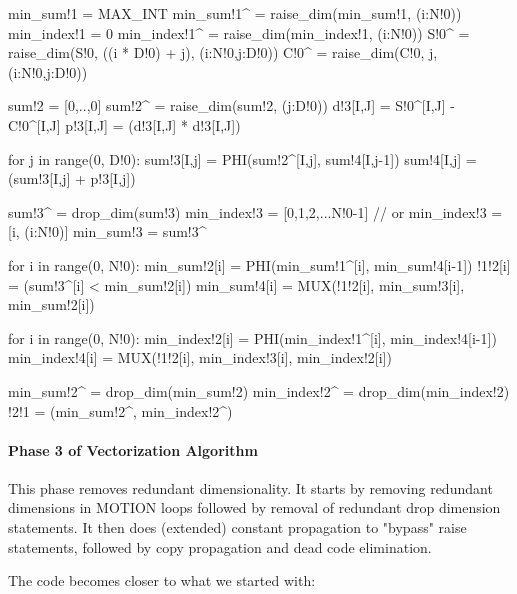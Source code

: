 {\small
\begin{pythonn}
min_sum!1 = MAX_INT
min_sum!1^ = raise_dim(min_sum!1, (i:N!0))
min_index!1 = 0
min_index!1^ = raise_dim(min_index!1, (i:N!0))
S!0^ = raise_dim(S!0, ((i * D!0) + j), (i:N!0,j:D!0))
C!0^ = raise_dim(C!0, j, (i:N!0,j:D!0))

sum!2 = [0,..,0]
sum!2^ = raise_dim(sum!2, (j:D!0))
d!3[I,J] = S!0^[I,J] - C!0^[I,J]
p!3[I,J] = (d!3[I,J] * d!3[I,J])

for j in range(0, D!0):
  sum!3[I,j] = PHI(sum!2^[I,j], sum!4[I,j-1])       
  sum!4[I,j] = (sum!3[I,j] + p!3[I,j])

sum!3^ = drop_dim(sum!3)     
min_index!3 = [0,1,2,...N!0-1] // or min_index!3 = [i, (i:N!0)]
min_sum!3 = sum!3^

for i in range(0, N!0):
  min_sum!2[i] = PHI(min_sum!1^[i], min_sum!4[i-1]) 
  !1!2[i] = (sum!3^[i] < min_sum!2[i])
  min_sum!4[i] = MUX(!1!2[i], min_sum!3[i], min_sum!2[i])
    
for i in range(0, N!0):
  min_index!2[i] = PHI(min_index!1^[i], min_index!4[i-1])  
   min_index!4[i] = MUX(!1!2[i], min_index!3[i], min_index!2[i])

min_sum!2^ = drop_dim(min_sum!2)
min_index!2^ = drop_dim(min_index!2)   
!2!1 = (min_sum!2^, min_index!2^)
\end{pythonn}
}



\paragraph{Phase 3 of Vectorization Algorithm}

This phase removes redundant dimensionality. 
It starts by removing redundant dimensions in MOTION loops followed
by removal of redundant drop dimension statements.
It then does (extended) constant propagation 
to "bypass" raise statements, followed by copy propagation
and dead code elimination.

The code becomes closer to what we started with:

